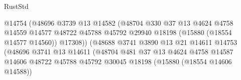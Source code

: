 \begin{lexlean}{RustStd}
\begin{coremodule}
                                                @14754
                                                (@48696
                                                  @3739
                                                  @13
                                                  @14582
                                                  (@48704
                                                    @330
                                                    @37
                                                    @13
                                                    @4624
                                                    @4758
                                                    @14559
                                                    @14577
                                                    @48722
                                                    @45788
                                                    @45792
                                                    @29940
                                                    @18198
                                                    (@15880 (@18554 @14577 @14560))
                                                    @17308))
                                                (@48688
                                                  @3741
                                                  @3890
                                                  @13
                                                  @21
                                                  @14611
                                                  @14753
                                                  (@48696
                                                    @3741
                                                    @13
                                                    @14611
                                                    (@48704
                                                      @481
                                                      @37
                                                      @13
                                                      @4624
                                                      @4758
                                                      @14587
                                                      @14606
                                                      @48722
                                                      @45788
                                                      @45792
                                                      @30045
                                                      @18198
                                                      (@15880 (@18554 @14606 @14588))

\end{coremodule}
\end{lexlean}
